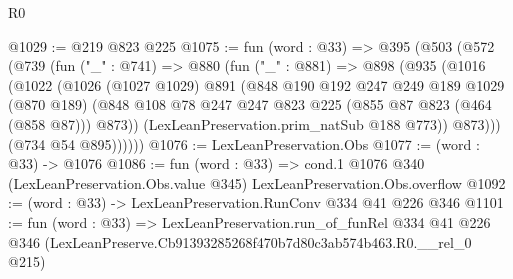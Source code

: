 \begin{lexlean}{R0}
\begin{coremodule}
@1029 := @219 @823 @225
@1075 := fun (word : @33) =>
  @395
    (@503
      (@572
        (@739
          (fun ("_" : @741) =>
          @880
            (fun ("_" : @881) =>
            @898
              (@935
                (@1016
                  (@1022
                    (@1026
                      (@1027 @1029)
                      @891
                      (@848
                        @190
                        @192
                        @247
                        @249
                        @189
                        @1029
                        (@870 @189)
                        (@848 @108 @78 @247 @247 @823 @225 (@855 @87 @823 (@464 (@858 @87))) @873))
                      (LexLeanPreservation.prim_natSub @188 @773))
                    @873)))
              (@734 @54 @895))))))
@1076 := LexLeanPreservation.Obs
@1077 := (word : @33) -> @1076
@1086 := fun (word : @33) =>
  cond.{1} @1076 @340 (LexLeanPreservation.Obs.value @345) LexLeanPreservation.Obs.overflow
@1092 := (word : @33) -> LexLeanPreservation.RunConv @334 @41 @226 @346
@1101 := fun (word : @33) =>
  LexLeanPreservation.run_of_funRel
    @334
    @41
    @226
    @346
    (LexLeanPreserve.Cb91393285268f470b7d80c3ab574b463.R0.__rel_0 @215)
\end{coremodule}
\end{lexlean}
